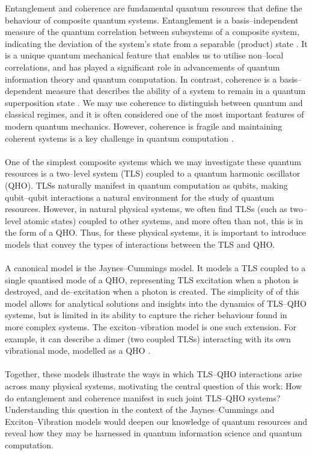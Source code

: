 \documentclass[11pt]{article}
\begin{document}
Entanglement and coherence are fundamental quantum resources that define the behaviour of composite quantum systems. Entanglement is a basis--independent measure of the quantum correlation between subsystems of a
composite system, indicating the deviation of the system’s state from a separable (product) state \cite{Entanglement2009-Definition}. It is a unique quantum mechanical feature that enables us to utilise non--local correlations, and has played a significant role in advancements of quantum information theory and quantum computation. In contrast, coherence is a basis--dependent measure that describes the ability of a system to remain in a quantum superposition state \cite{Coherence2017-Colloquium}. We may use coherence to distinguish between quantum and classical regimes, and it is often considered one of the most important features of modern quantum mechanics. However, coherence is fragile and maintaining coherent systems is a key challenge in quantum computation \cite{OQS2019_decoherence}. \\
\\
One of the simplest composite systems which we may investigate these quantum resources is a two--level system (TLS) coupled to a quantum harmonic oscillator (QHO). TLSs naturally manifest in quantum computation as qubits, making qubit–qubit interactions a natural environment for the study of quantum resources. However, in natural physical systems, we often find TLSs (such as two--level atomic states) coupled to other systems, and more often than not, this is in the form of a QHO. Thus, for these physical systems, it is important to introduce models that convey the types of interactions between the TLS and QHO.\\
\\
A canonical model is the Jaynes--Cummings model. It models a TLS coupled to a single quantised mode of a QHO, representing TLS excitation when a photon is destroyed, and de--excitation when a photon is created. The simplicity of of this model allows for analytical solutions and insights into the dynamics of TLS--QHO systems, but is limited in its ability to capture the richer behaviour found in more complex systems. The exciton–vibration model is one such extension. For example, it can describe a dimer (two coupled TLSs) interacting with its own vibrational mode, modelled as a QHO \cite{ExVib2014-Alexandra}.\\
\\
Together, these models illustrate the ways in which TLS–QHO interactions arise across many physical systems, motivating the central question of this work: How do entanglement and coherence manifest in such joint TLS--QHO systems? Understanding this question in the context of the Jaynes--Cummings and Exciton--Vibration models would deepen our knowledge of quantum resources and reveal how they may be harnessed in quantum information science and quantum computation. \\
\end{document}
